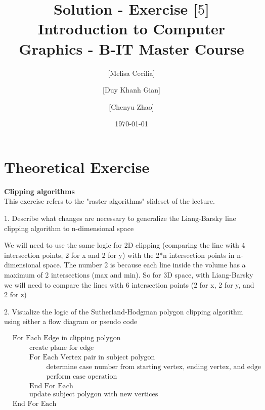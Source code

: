 \documentclass[10pt,a4paper]{article}
\begin{document}
\title{Solution - Exercise [$5$]\\
\small{Introduction to Computer Graphics - B-IT Master Course}}
\author{ [Melisa Cecilia] \and [Duy Khanh Gian] \and [Chenyu Zhao]}
\date{\today}
\maketitle

\section*{Theoretical Exercise}
{\bf Clipping algorithms } \\

This exercise refers to the "raster algorithms" slideset of the lecture. \\

\begin{flushleft}
1. Describe what changes are necessary to generalize the Liang-Barsky line clipping algorithm to n-dimensional space
\end{flushleft}

 We will need to use the same logic for 2D clipping (comparing the line with 4 intersection points, 2 for x and 2 for y) with the 2*n intersection points in n-dimensional space. The number 2 is because each line inside the volume has a maximum of 2 intersections (max and min). So for 3D space, with Liang-Barsky we will need to compare the lines with 6 intersection points (2 for x, 2 for y, and 2 for z) \\
 
\begin{flushleft}
2. Visualize the logic of the Sutherland-Hodgman polygon clipping algorithm using either a flow diagram or pseudo code
\end{flushleft}

\begin{align*}
  &\text{For Each Edge in clipping polygon} \\
  & \hspace{1cm} \text{create plane for edge} \\
  & \hspace{1cm} \text{For Each Vertex pair in subject polygon} \\
  	& \hspace{2cm} \text{determine case number from starting vertex, ending vertex, and edge} \\
	& \hspace{2cm} \text{perform case operation} \\
  & \hspace{1cm} \text{End For Each} \\
  & \hspace{1cm} \text{update subject polygon with new vertices} \\
  &\text{End For Each}
\end{align*}
\end{document}
